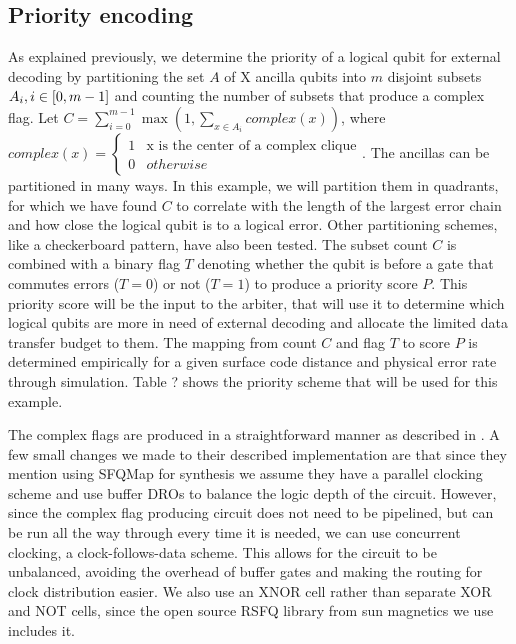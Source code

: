 \documentclass{article}
\begin{document}
\subsection{Priority encoding}
As explained previously, we determine the priority of a logical qubit for external decoding by partitioning the set $A$ of X ancilla qubits into $m$ disjoint subsets $A_i, i \in \interval{0}{m-1}$ and counting the number of subsets that produce a complex flag.
Let $C = \sum_{i=0}^{m-1} \max(1, \sum_{x \in A_i}{complex(x)})$, where 
$complex(x) = \begin{cases} 1 &
\text{x is the center of a complex clique} \\ 0 & otherwise \end{cases}$.
The ancillas can be partitioned in many ways.
In this example, we will partition them in quadrants, for which we have found $C$ to correlate with the length of the largest error chain and how close the logical qubit is to a logical error.
Other partitioning schemes, like a checkerboard pattern, have also been tested.
The subset count $C$ is combined with a binary flag $T$ denoting whether the qubit is before a gate that commutes errors ($T=0$) or not ($T=1$) to produce a priority score $P$.
This priority score will be the input to the arbiter, that will use it to determine which logical qubits are more in need of external decoding and allocate the limited data transfer budget to them.
The mapping from count $C$ and flag $T$ to score $P$ is determined empirically for a given surface code distance and physical error rate through simulation.
Table ? shows the priority scheme that will be used for this example.

The complex flags are produced in a straightforward manner as described in \cite{clique}.
A few small changes we made to their described implementation are that since they mention using SFQMap \cite{sfqmap} for synthesis we assume they have a parallel clocking scheme and use buffer DROs to balance the logic depth of the circuit. 
However, since the complex flag producing circuit does not need to be pipelined, but can be run all the way through every time it is needed, we can use concurrent clocking, a clock-follows-data scheme.
This allows for the circuit to be unbalanced, avoiding the overhead of buffer gates and making the routing for clock distribution easier.
We also use an XNOR cell rather than separate XOR and NOT cells, since the open source RSFQ library from sun magnetics we use \cite{rsfqlib} includes it.
\end{document}
